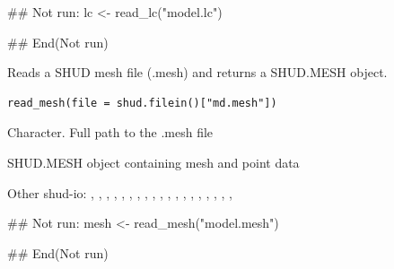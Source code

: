 \documentclass[a4paper]{book}
\begin{document}
%
\begin{Examples}
\begin{ExampleCode}
## Not run: 
lc <- read_lc("model.lc")

## End(Not run)
\end{ExampleCode}
\end{Examples}
%
\begin{Description}\relax
Reads a SHUD mesh file (.mesh) and returns a SHUD.MESH object.
\end{Description}
%
\begin{Usage}
\begin{verbatim}
read_mesh(file = shud.filein()["md.mesh"])
\end{verbatim}
\end{Usage}
%
\begin{Arguments}
\begin{ldescription}
\item[\code{file}] Character. Full path to the .mesh file
\end{ldescription}
\end{Arguments}
%
\begin{Value}
SHUD.MESH object containing mesh and point data
\end{Value}
%
\begin{SeeAlso}\relax
Other shud-io: 
,
,
,
,
,
,
,
,
,
,
,
,
,
,
,
,
,
,
,
\end{SeeAlso}
%
\begin{Examples}
\begin{ExampleCode}
## Not run: 
mesh <- read_mesh("model.mesh")

## End(Not run)
\end{ExampleCode}
\end{Examples}
\end{document}
